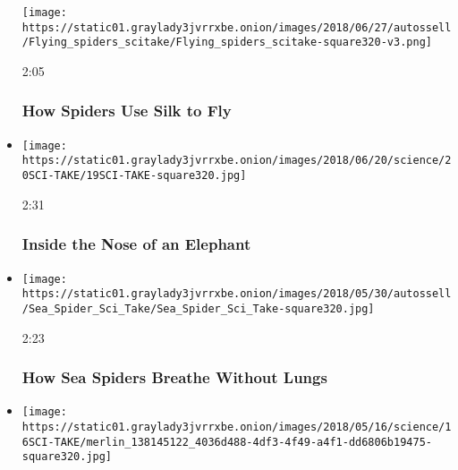 \begin{itemize}
  \texttt{[image: https://static01.graylady3jvrrxbe.onion/images/2018/06/27/autossell/Flying\_spiders\_scitake/Flying\_spiders\_scitake-square320-v3.png]}

  2:05

  \hypertarget{how-spiders-use-silk-to-fly}{%
  \subsubsection{How Spiders Use Silk to
  Fly}\label{how-spiders-use-silk-to-fly}}
\item
  \href{https://www.nytimes3xbfgragh.onion/video/science/100000005936008/inside-the-nose-of-an-elephant.html?action=click\&module=video-series-bar\&region=header\&pgtype=Article\&playlistId=video/sciencetake}{}

  \texttt{[image: https://static01.graylady3jvrrxbe.onion/images/2018/06/20/science/20SCI-TAKE/19SCI-TAKE-square320.jpg]}

  2:31

  \hypertarget{inside-the-nose-of-an-elephant}{%
  \subsubsection{Inside the Nose of an
  Elephant}\label{inside-the-nose-of-an-elephant}}
\item
  \href{https://www.nytimes3xbfgragh.onion/video/science/100000005908234/no-lungs-no-gills-how-do-sea-spiders-breathe.html?action=click\&module=video-series-bar\&region=header\&pgtype=Article\&playlistId=video/sciencetake}{}

  \texttt{[image: https://static01.graylady3jvrrxbe.onion/images/2018/05/30/autossell/Sea\_Spider\_Sci\_Take/Sea\_Spider\_Sci\_Take-square320.jpg]}

  2:23

  \hypertarget{how-sea-spiders-breathe-without-lungs}{%
  \subsubsection{How Sea Spiders Breathe Without
  Lungs}\label{how-sea-spiders-breathe-without-lungs}}
\item
  \href{https://www.nytimes3xbfgragh.onion/video/science/100000005865737/did-asteroids-bring-water-to-earth.html?action=click\&module=video-series-bar\&region=header\&pgtype=Article\&playlistId=video/sciencetake}{}

  \texttt{[image: https://static01.graylady3jvrrxbe.onion/images/2018/05/16/science/16SCI-TAKE/merlin\_138145122\_4036d488-4df3-4f49-a4f1-dd6806b19475-square320.jpg]}


\end{itemize}

